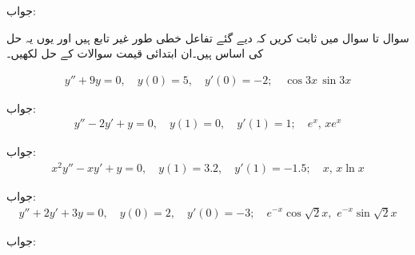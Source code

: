 جواب: 

سوال  تا سوال  میں ثابت کریں کہ دیے گئے تفاعل خطی طور غیر تابع ہیں اور یوں یہ حل کی اساس ہیں۔ان ابتدائی قیمت سوالات کے حل لکھیں۔


\begin{align*}
y''+9y=0,\quad y(0)=5, \quad y'(0)=-2; \quad \cos 3x \, \sin 3x
\end{align*}

جواب:
\begin{align*}
y''-2y'+y=0, \quad y(1)=0, \quad y'(1)=1;\quad e^x,\, xe^x
\end{align*}

جواب:
\begin{align*}
x^2y''-xy'+y=0, \quad y(1)=3.2, \quad y'(1)=-1.5;\quad x,\, x\ln x
\end{align*}

جواب:
\begin{align*}
y''+2y'+3y=0, \quad y(0)=2, \quad y'(0)=-3;\quad e^{-x}\cos \sqrt{2}x, \,\, e^{-x}\sin \sqrt{2} x
\end{align*}

جواب:

